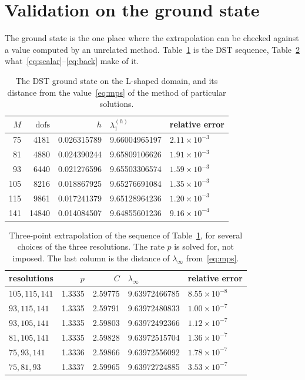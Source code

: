 \documentclass[11pt,a4paper]{article}
\newcommand{\dofs}{\mathrm{dofs}}
\begin{document}
\section{Validation on the ground state}
\label{sec:validation}

The ground state is the one place where the extrapolation can be checked against
a value computed by an unrelated method. Table~\ref{tab:seq} is the DST sequence,
Table~\ref{tab:rich} what~\eqref{eq:scalar}--\eqref{eq:back} make of it.

\begin{table}[htbp]
  \centering
  \caption{The DST ground state on the L-shaped domain, and its distance from
           the value~\eqref{eq:mps} of the method of particular solutions.}
  \label{tab:seq}
  \begin{tabular}{rrrll}
    \toprule
    $M$ & $\dofs$ & $h$ & $\lambda_1^{(h)}$ & relative error \\
    \midrule
     75 &  4181 & 0.026315789 & 9.66004965197 & $2.11 \times 10^{-3}$ \\
     81 &  4880 & 0.024390244 & 9.65809106626 & $1.91 \times 10^{-3}$ \\
     93 &  6440 & 0.021276596 & 9.65503306574 & $1.59 \times 10^{-3}$ \\
    105 &  8216 & 0.018867925 & 9.65276691084 & $1.35 \times 10^{-3}$ \\
    115 &  9861 & 0.017241379 & 9.65128964236 & $1.20 \times 10^{-3}$ \\
    141 & 14840 & 0.014084507 & 9.64855601236 & $9.16 \times 10^{-4}$ \\
    \bottomrule
  \end{tabular}
\end{table}

\begin{table}[htbp]
  \centering
  \caption{Three-point extrapolation of the sequence of Table~\ref{tab:seq}, for
           several choices of the three resolutions. The rate $p$ is solved for,
           not imposed. The last column is the distance of $\lambda_\infty$
           from~\eqref{eq:mps}.}
  \label{tab:rich}
  \begin{tabular}{lrrll}
    \toprule
    resolutions & $p$ & $C$ & $\lambda_\infty$ & relative error \\
    \midrule
    $105, 115, 141$ & 1.3335 & 2.59775 & 9.63972466785 & $8.55 \times 10^{-8}$ \\
    $93, 115, 141$  & 1.3335 & 2.59791 & 9.63972480833 & $1.00 \times 10^{-7}$ \\
    $93, 105, 141$  & 1.3335 & 2.59803 & 9.63972492366 & $1.12 \times 10^{-7}$ \\
    $81, 105, 141$  & 1.3335 & 2.59828 & 9.63972515704 & $1.36 \times 10^{-7}$ \\
    $75, 93, 141$   & 1.3336 & 2.59866 & 9.63972556092 & $1.78 \times 10^{-7}$ \\
    $75, 81, 93$    & 1.3337 & 2.59965 & 9.63972724885 & $3.53 \times 10^{-7}$ \\
    \bottomrule
  \end{tabular}
\end{table}
\end{document}
